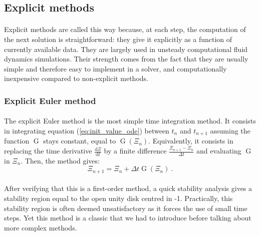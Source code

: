     \subsection{Explicit methods}

      \paragraph{}
      Explicit methods are called this way because, at each step, the computation of the next solution is straightforward: they give it explicitly as a function of currently available data.
      They are largely used in unsteady computational fluid dynamics simulations.
      Their strength comes from the fact that they are usually simple and therefore easy to implement in a solver, and computationally inexpensive compared to non-explicit methods.


      \subsubsection{Explicit Euler method}

        \paragraph{}
        The explicit Euler method is the most simple time integration method.
        It consists in integrating equation (\ref{eq:init_value_ode}) between $t_n$ and $t_{n+1}$ assuming the function $\operatorname{G}$ stays constant, equal to $\operatorname{G}\left(\Xi_n\right)$.
        Equivalently, it consists in replacing the time derivative $\frac{\mathrm{d} \Xi}{\mathrm{d} t}$ by a finite difference $\frac{\Xi_{n+1} - \Xi_n}{\Delta t}$ and evaluating $\operatorname{G}$ in $\Xi_n$.
        Then, the method gives:
        \begin{equation}
          \Xi_{n+1} = \Xi_n + \Delta t \operatorname{G}\left(\Xi_n\right) \ .
        \end{equation}

        \paragraph{}
        After verifying that this is a first-order method, a quick stability analysis gives a stability region equal to the open unity disk centred in -1.
        Practically, this stability region is often deemed unsatisfactory as it forces the use of small time steps.
        Yet this method is a classic that we had to introduce before talking about more complex methods.


